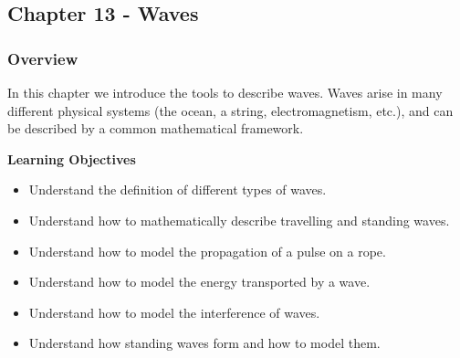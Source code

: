 \subsection{Chapter 13 - Waves}

\subsubsection{Overview}\label{chapter:waves}

In this chapter we introduce the tools to describe waves. Waves arise in many different physical systems (the ocean, a string, electromagnetism, etc.), and can be described by a common mathematical framework.

\begin{framed}
\textbf{Learning Objectives}\\
\begin{itemize}
\item Understand the definition of different types of waves.
\item Understand how to mathematically describe travelling and standing waves.
\item Understand how to model the propagation of a pulse on a rope.
\item Understand how to model the energy transported by a wave.
\item Understand how to model the interference of waves.
\item Understand how standing waves form and how to model them.
\end{itemize}
\end{framed}

